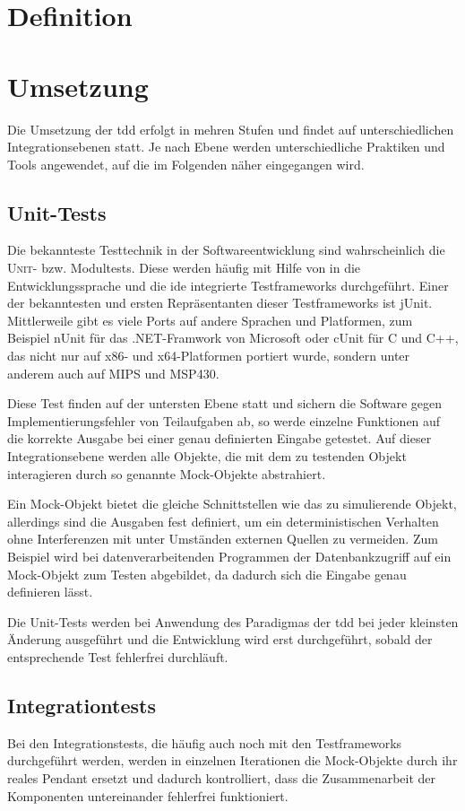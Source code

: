 \documentclass{mitschrift}
\newcommand{\pje}{\marginpar{Philipp\\Jeske}}
\newcommand{\bmn}{\marginpar{Benjamin\\Morgan}}
\begin{document}
\chapter{Definition}
\bmn
\chapter{Umsetzung}
\pje
Die Umsetzung der \gls{tdd} erfolgt in mehren Stufen und findet auf unterschiedlichen Integrationsebenen statt. Je nach Ebene werden unterschiedliche Praktiken und Tools angewendet, auf die im Folgenden näher eingegangen wird.

\section{Unit-Tests}
Die bekannteste Testtechnik in der Softwareentwicklung sind wahrscheinlich die \textsc{Unit}- bzw. Modultests. Diese werden häufig mit Hilfe von in die Entwicklungssprache und die \gls{ide} integrierte Testframeworks durchgeführt. Einer der bekanntesten und ersten Repräsentanten dieser Testframeworks ist jUnit. Mittlerweile gibt es viele Ports auf andere Sprachen und Platformen, zum Beispiel nUnit für das .NET-Framwork von Microsoft oder cUnit für C und C++, das nicht nur auf x86- und x64-Platformen portiert wurde, sondern unter anderem auch auf MIPS und MSP430.

Diese Test finden auf der untersten Ebene statt und sichern die Software gegen Implementierungsfehler von Teilaufgaben ab, so werde einzelne Funktionen auf die korrekte Ausgabe bei einer genau definierten Eingabe getestet. Auf dieser Integrationsebene werden alle Objekte, die mit dem zu testenden Objekt interagieren durch so genannte Mock-Objekte abstrahiert.

Ein Mock-Objekt bietet die gleiche Schnittstellen wie das zu simulierende Objekt, allerdings sind die Ausgaben fest definiert, um ein deterministischen Verhalten ohne Interferenzen mit unter Umständen externen Quellen zu vermeiden. Zum Beispiel wird bei datenverarbeitenden Programmen der Datenbankzugriff auf ein Mock-Objekt zum Testen abgebildet, da dadurch sich die Eingabe genau definieren lässt.

Die Unit-Tests werden bei Anwendung des Paradigmas der \gls{tdd} bei jeder kleinsten Änderung ausgeführt und die Entwicklung wird erst durchgeführt, sobald der entsprechende Test fehlerfrei durchläuft.

\section{Integrationtests}
Bei den Integrationstests, die häufig auch noch mit den Testframeworks durchgeführt werden, werden in einzelnen Iterationen die Mock-Objekte durch ihr reales Pendant ersetzt und dadurch kontrolliert, dass die Zusammenarbeit der Komponenten untereinander fehlerfrei funktioniert.
\end{document}
